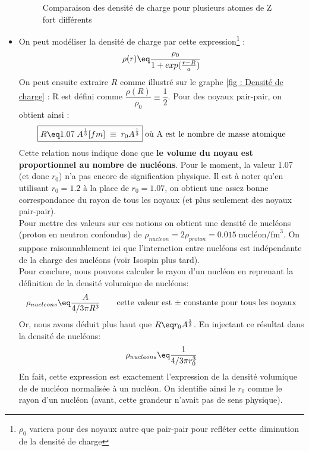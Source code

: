 \begin{itemize}[label=$\bullet$]
\begin{figure}[H]
        \caption{Comparaison des densité de charge pour plusieurs atomes de Z fort différents}
        \label{fig : Comparaison des densités de charge noyaux lourds}
    \end{figure}
    \item On peut modéliser la densité de charge par cette expression\footnote{$\rho_0$ variera pour des noyaux autre que pair-pair pour refléter cette diminution de la densité de charge} :
    \begin{equation*}
        \rho(r) \eq \frac{\rho_0}{1 + exp (\frac{r - R}{a})}
    \end{equation*}
    On peut ensuite extraire $R$ comme illustré sur le graphe \ref{fig : Densité de charge} : R est défini comme $\dfrac{\rho(R)}{\rho_0} \equiv \dfrac{1}{2}$. Pour des noyaux pair-pair, on obtient ainsi :
    \begin{equation*}
        \boxed{
            R \eq 1.07\; A^{\frac{1}{3}} [fm] \;\equiv\; r_0A^{\frac{1}{3}}
        } \; \text{où A est le nombre de masse atomique}
    \end{equation*}
    Cette relation nous indique donc que \textbf{le volume du noyau est proportionnel au nombre de nucléons}. Pour le moment, la valeur 1.07 (et donc $r_0$) n'a pas encore de signification physique. Il est à noter qu'en utilisant $r_0=1.2$ à la place de $r_0=1.07$, on obtient une assez bonne correspondance du rayon de tous les noyaux (et plus seulement des noyaux pair-pair).
    \smallskip\\
    Pour mettre des valeurs sur ces notions on obtient une densité de nucléons (proton en neutron confondus) de $\rho_{nucleon} = 2\rho_{proton} = 0.015 \;\text{nucléon/fm}^3$. On suppose raisonnablement ici que l'interaction entre nucléons est indépendante de la charge des nucléons (voir Isospin plus tard).\\
    Pour conclure, nous pouvons calculer le rayon d'un nucléon
    en reprenant la définition de la densité volumique de nucléons:
    \begin{equation*}
        \rho_{nucleons} \eq \frac{A}{4/3 \pi R^3 } \qquad \text{cette valeur est $\pm$ constante pour tous les noyaux}
    \end{equation*}
    Or, nous avons déduit plus haut que $R \eq r_0A^{\frac{1}{3}}$. En injectant ce résultat dans la densité de nucléons:
    \begin{equation*}
        \rho_{nucleons} \eq \frac{1}{4/3 \pi r_0^3}
    \end{equation*}
    En fait, cette expression est exactement l'expression de la densité volumique de de nucléon normalisée à un nucléon. On identifie ainsi le $r_0$ comme le rayon d'un nucléon (avant, cette grandeur n'avait pas de sens physique).\\


\end{itemize}

